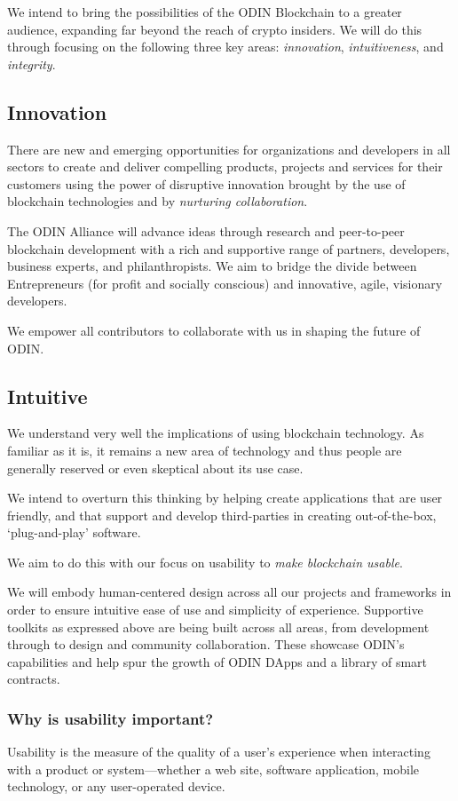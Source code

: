 \documentclass[12pt,letterpaper]{article}
\begin{document}
We intend to bring the possibilities of the ODIN Blockchain to a greater audience, expanding far beyond the reach of crypto insiders. We will do this through focusing on the following three key areas: \textit{innovation}, \textit{intuitiveness}, and \textit{integrity}. 

\subsection{Innovation}
There are new and emerging opportunities for organizations and developers in all sectors to create and deliver compelling products, projects and services for their customers using the power of disruptive innovation brought by the use of blockchain technologies and by \textit{nurturing collaboration}.

The ODIN Alliance will advance ideas through research and peer-to-peer blockchain development with a rich and supportive range of partners, developers, business experts, and philanthropists. We aim to bridge the divide between Entrepreneurs (for profit and socially conscious) and innovative, agile, visionary developers.  

We empower all contributors to collaborate with us in shaping the future of ODIN.

\subsection{​Intuitive}
We understand very well the implications of using blockchain technology. As familiar as it is, it remains a new area of technology and thus people are generally reserved or even skeptical about its use case.

We intend to overturn this thinking by helping create applications that are user friendly, and that support and develop third-parties in creating out-of-the-box, `plug-and-play' software.

We aim to do this with our focus on usability to \textit{make blockchain usable}.

We will embody human-centered design across all our projects and frameworks in order to ensure intuitive ease of use and simplicity of experience. Supportive toolkits as expressed above are being built across all areas, from development through to design and community collaboration. These showcase ODIN's capabilities and help spur the growth of ODIN DApps and a library of smart contracts.

\subsubsection{Why is usability important?}
Usability is the measure of the quality of a user's experience when interacting with a product or system---whether a web site, software application, mobile technology, or any user-operated device.
\end{document}
